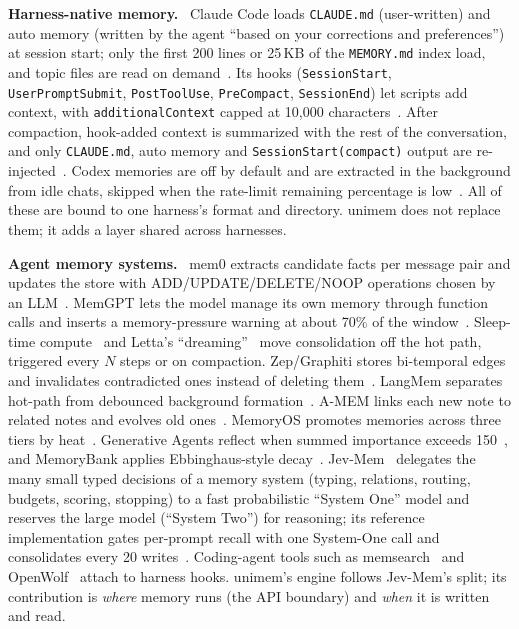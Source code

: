 \documentclass[10pt,twocolumn]{article}
\newcommand{\sys}{\textsf{unimem}}
\newcommand{\code}[1]{\texttt{\small #1}}
\newcommand{\para}[1]{\smallskip\noindent\textbf{#1}\ }
\begin{document}
\para{Harness-native memory.} Claude Code loads \code{CLAUDE.md} (user-written) and auto memory (written by the
agent ``based on your corrections and preferences'') at session start; only the first 200 lines or 25\,KB of the
\code{MEMORY.md} index load, and topic files are read on demand~\cite{ccmemory}. Its hooks (\code{SessionStart},
\code{UserPromptSubmit}, \code{PostToolUse}, \code{PreCompact}, \code{SessionEnd}) let scripts add context, with
\code{additionalContext} capped at 10,000 characters~\cite{cchooks}. After compaction, hook-added context is
summarized with the rest of the conversation, and only \code{CLAUDE.md}, auto memory and \code{SessionStart(compact)}
output are re-injected~\cite{cccontext}. Codex memories are off by default and are extracted in the background from
idle chats, skipped when the rate-limit remaining percentage is low~\cite{codexmemories}. All of these are bound to
one harness's format and directory. \sys{} does not replace them; it adds a layer shared across harnesses.

\para{Agent memory systems.} mem0 extracts candidate facts per message pair and updates the store with
ADD/UPDATE/DELETE/NOOP operations chosen by an LLM~\cite{mem0}. MemGPT lets the model manage its own memory through
function calls and inserts a memory-pressure warning at about 70\% of the window~\cite{memgpt}. Sleep-time
compute~\cite{sleeptime} and Letta's ``dreaming''~\cite{lettadocs} move consolidation off the hot path, triggered every
$N$ steps or on compaction. Zep/Graphiti stores bi-temporal edges and invalidates contradicted ones instead of deleting
them~\cite{zep}. LangMem separates hot-path from debounced background formation~\cite{langmem}. A-MEM links each new
note to related notes and evolves old ones~\cite{amem}. MemoryOS promotes memories across three tiers by
heat~\cite{memoryos}. Generative Agents reflect when summed importance exceeds 150~\cite{genagents}, and MemoryBank
applies Ebbinghaus-style decay~\cite{memorybank}. Jev-Mem~\cite{jevmem2026} delegates the many small typed
decisions of a memory system (typing, relations, routing, budgets, scoring, stopping) to a fast probabilistic
``System One'' model and reserves the large model (``System Two'') for reasoning; its reference implementation
gates per-prompt recall with one System-One call and consolidates every 20 writes~\cite{jevmemrepo}. Coding-agent
tools such as memsearch~\cite{memsearch} and OpenWolf~\cite{openwolf} attach to harness hooks. \sys{}'s engine follows
Jev-Mem's split; its contribution is \emph{where} memory runs (the API boundary) and \emph{when} it is written and read.
\end{document}
